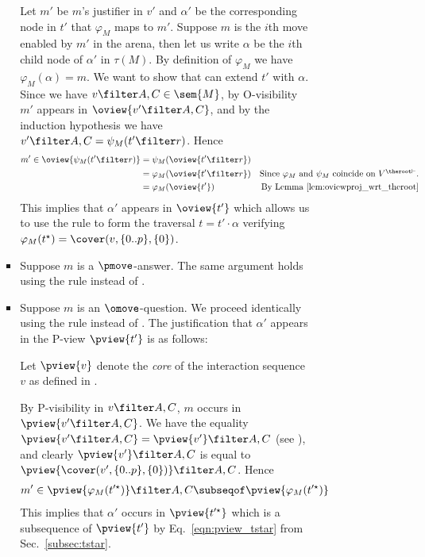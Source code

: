 \begin{itemize}[$\bullet$]
\begin{description}
\begin{enumerate}[1.]
\begin{itemize}
\begin{itemize}
                       Let $m'$ be $m$'s justifier in $v'$ and $\alpha'$ be the corresponding node in $t'$ that $\varphi_M$ maps to $m'$.
                       Suppose $m$ is the $i$th move enabled by $m'$ in the arena, then let us write $\alpha$ be the $i$th child node of $\alpha'$ in $\tau(M)$. By definition of $\varphi_M$ we have $\varphi_M(\alpha) = m$.
                       We want to show that  can extend $t'$ with $\alpha$. Since we have $v\filter A,C \in \sem{M}$, by O-visibility $m'$ appears in $\oview{v'\filter A,C}$, and by the induction hypothesis we have $v'\filter A,C = \psi_M (t'\filter r)$. Hence \begin{align*}
                       m' \in \oview{\psi_M (t'\filter r)} &= \psi_M ( \oview{t'\filter r}) \\
                          &= \varphi_M ( \oview{t' \filter r}) & \mbox{Since $\varphi_M$ and $\psi_M$ coincide on $V^{\theroot \vdash}$.} \\
                        &= \varphi_M ( \oview{t'}) & \mbox{By Lemma \ref{lem:oviewproj_wrt_theroot}} \end{align*}
               This implies that $\alpha'$ appears in $\oview{t'}$ which allows us to use the rule  to form the traversal $t = t'\cdot \alpha$ verifying $\varphi_M(t^\star) =               \cover(v,\{0..p\},\{0\})$.

                \item Suppose $m$ is a $\pmove$-answer. The same argument holds using the rule  instead of .

               \item  Suppose $m$ is an $\omove$-question.
                   We proceed identically using the rule  instead of .                   The justification that
                   $\alpha'$ appears in the P-view $\pview{t'}$ is as follows:

                   Let $\pview{v}$ denote the \emph{core} of the interaction sequence $v$ as defined in \cite{McCusker-GamesandFullAbstrac}.

                   By P-visibility in $v\filter A,C$, $m$ occurs in $\pview{v' \filter A,C}$. We have the equality $\pview{v' \filter A,C} = \pview{v'} \filter A,C$ (see \cite{McCusker-GamesandFullAbstrac}), and clearly $\pview{v'} \filter A,C$ is equal to $\pview{\cover(v', \{0..p\}, \{0\})}\filter A,C$.
                   Hence
                    \begin{align*}
                       m' \in \pview{\varphi_M (t'^\star)} \filter A,C &\subseqof  \pview{\varphi_M (t'^\star)}
                   \end{align*}
                   This implies that $\alpha'$ occurs in $\pview{t'^\star}$ which is a subsequence of $\pview{t'}$ by Eq.\ \ref{eqn:pview_tstar}
                   from Sec.\ \ref{subsec:tstar}.


\end{itemize}
\end{itemize}
\end{enumerate}
\end{description}
\end{itemize}
